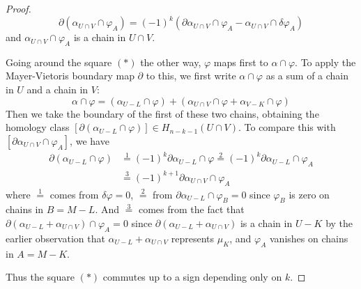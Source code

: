 \begin{proof}
\[\partial(\alpha_{U\cap V}\cap\varphi_A)=(-1)^k(\partial\alpha_{U\cap V}\cap\varphi_A-\alpha_{U\cap V}\cap\delta\varphi_A)\]
and $\alpha_{U\cap V}\cap\varphi_A$ is a chain in $U\cap V$.\par
Going around the square $(*)$ the other way, $\varphi$ maps first to $\alpha\cap\varphi$. To apply the Mayer-Vietoris boundary map $\partial$ to this, we first write $\alpha\cap\varphi$ as a sum of a chain in $U$ and a chain in $V$:
\[\alpha\cap\varphi=(\alpha_{U-L}\cap\varphi)+(\alpha_{U\cap V}\cap\varphi+\alpha_{V-K}\cap\varphi)\]
Then we take the boundary of the first of these two chains, obtaining the homology class $[\partial(\alpha_{U-L}\cap\varphi)]\in H_{n-k-1}(U\cap V)$. To compare this with $[\partial\alpha_{U\cap V}\cap\varphi_A]$, we have
\begin{align*}
\partial(\alpha_{U-L}\cap\varphi)&\stackrel{1}{=}(-1)^k\partial\alpha_{U-L}\cap\varphi\stackrel{2}{=}(-1)^k\partial\alpha_{U-L}\cap\varphi_A\\
&\stackrel{3}{=}(-1)^{k+1}\partial\alpha_{U\cap V}\cap\varphi_A
\end{align*}
where $\stackrel{1}{=}$ comes from $\delta\varphi=0$, $\stackrel{2}{=}$ from $\partial\alpha_{U-L}\cap\varphi_B=0$ since $\varphi_B$ is zero on chains in $B=M-L$. And $\stackrel{3}{=}$ comes from the fact that $\partial(\alpha_{U-L}+\alpha_{U\cap V})\cap\varphi_A=0$ since $\partial(\alpha_{U-L}+\alpha_{U\cap V})$ is a chain in $U-K$ by the earlier observation that $\alpha_{U-L}+\alpha_{U\cap V}$ represents $\mu_K$, and $\varphi_A$ vanishes on chains in $A=M-K$.\par
Thus the square $(*)$ commutes up to a sign depending only on $k$.
\end{proof}
